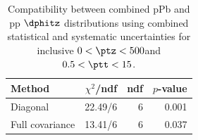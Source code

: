 \begin{table}[htp!]
\centering
\begin{tabular}{|l|r|r|r|}
\hline
Method & $\chi^2$/ndf & ndf & $p$-value \\
\hline
Diagonal & 22.49/6 & 6 & 0.001 \\
Full covariance & 13.41/6 & 6 & 0.037 \\
\hline
\end{tabular}
\caption{Compatibility between combined pPb and pp $\dphitz$ distributions using combined statistical and systematic uncertainties for inclusive $0 < \ptz < 500$\GeV and $0.5 < \ptt < 15$\GeV.}
\label{table:chisq_dphi}
\end{table}
